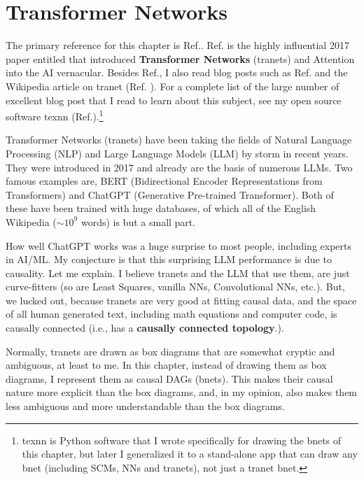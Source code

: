 \chapter{Transformer Networks}
\label{ch-transformer}

The primary reference for this chapter is  Ref.\cite{attention-is-all-you-need}.
Ref.\cite{attention-is-all-you-need} is
 the highly influential  2017 paper entitled
that introduced {\bf Transformer Networks} (tranets) and
Attention into the AI vernacular.
Besides Ref.\cite{attention-is-all-you-need},
I also read blog posts
such as Ref.\cite{joshi-trans}
and the Wikipedia article on  tranet (Ref. \cite{wiki-transformer}).
For a complete list of the large number
of excellent blog post that I read to learn
about this subject, see my open source software texnn
(Ref.\cite{texnn}).\footnote{
texnn is
 Python software
 that I wrote
specifically for drawing the bnets
of this chapter, but later I
generalized it to a stand-alone app that can draw
any bnet (including SCMs, NNs and tranets), not just a tranet bnet.}

Transformer Networks (tranets)
have been taking the fields of
Natural Language Processing (NLP)
and Large Language Models (LLM)
by storm in recent years.
They were introduced in 2017 and already
are the basis of numerous LLMs.
Two famous examples are,
BERT (Bidirectional Encoder
Representations from Transformers)
and ChatGPT (Generative Pre-trained Transformer).
Both of these
have been trained with
huge databases,
of which all of
the English Wikipedia ($\sim 10^9$ words)
is but a small part.

How well ChatGPT works was a huge
surprise to most people, including experts in AI/ML.
My conjecture is that this surprising
LLM performance is
 due to causality.
 Let me explain. I believe tranets and the LLM that use them, are just curve-fitters (so are Least Squares, vanilla NNs, Convolutional NNs, etc.). But, we lucked out, because
tranets are very good at fitting causal data, and the space of all human generated text, including math
equations and computer code,
is causally connected (i.e., has
a {\bf causally connected topology}.).

Normally, tranets are
drawn as box diagrams
that are somewhat cryptic and ambiguous, at least to me.
In this chapter,
instead of
drawing them as box diagrams,
I represent them as causal DAGs (bnets). This makes their
causal nature more explicit than
the box diagrams, and,
in my opinion, also makes them
less ambiguous  and more understandable than the box diagrams.




